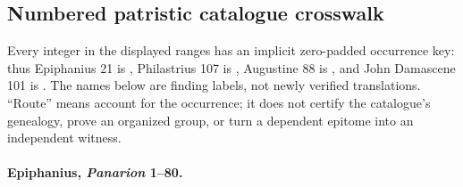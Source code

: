 \subsection{Numbered patristic catalogue crosswalk}\label{app:census-catalogues}

Every integer in the displayed ranges has an implicit zero-padded occurrence key: thus Epiphanius 21 is , Philastrius 107 is , Augustine 88 is , and John Damascene 101 is . The names below are finding labels, not newly verified translations. ``Route'' means account for the occurrence; it does not certify the catalogue's genealogy, prove an organized group, or turn a dependent epitome into an independent witness.

\paragraph{Epiphanius, \emph{Panarion} 1--80.}
